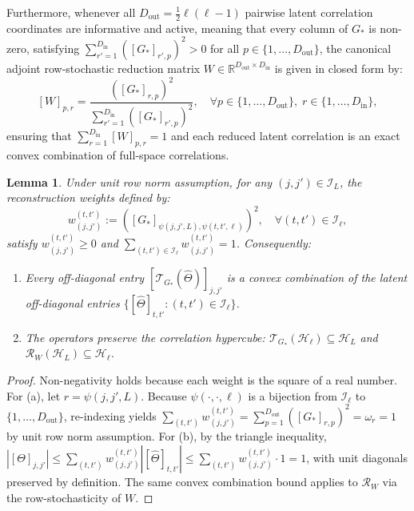 \documentclass[default,sn-mathphys,Numbered]{sn-jnl}
\theoremstyle{thmstyleone}
\newtheorem{lemma}[theorem]{Lemma}
\theoremstyle{thmstylethree}
\theoremstyle{thmstyletwo}
\newcommand{\inp}{\text{in}}
\newcommand{\outp}{\text{out}}
\begin{document}
Furthermore, whenever all $D_{\outp} = \frac{1}{2}\ell(\ell-1)$ pairwise latent correlation coordinates are informative and active, meaning that every column of $G_*$ is non-zero, satisfying $\sum_{r'=1}^{D_{\inp}} ([G_*]_{r', p})^2 > 0$ for all $p \in \{1, \ldots, D_{\outp}\}$, the canonical adjoint row-stochastic reduction matrix $W \in \mathbb{R}^{D_{\outp} \times D_{\inp}}$ is given in closed form by:
\begin{equation}
\label{eq:W_definition}
[W]_{p, r} = \frac{\left([G_*]_{r, p}\right)^2}{\sum_{r'=1}^{D_{\inp}} \left([G_*]_{r', p}\right)^2}, \quad \forall p \in \{1, \ldots, D_{\outp}\}, \; r \in \{1, \ldots, D_{\inp}\},
\end{equation}
ensuring that $\sum_{r=1}^{D_{\inp}} [W]_{p, r} = 1$ and each reduced latent correlation is an exact convex combination of full-space correlations.
    
\begin{lemma}
\label{lem:convex}\label{lem:entry_bound}\label{th:entry_bound}\label{lem:convex_bound}
Under unit row norm assumption, for any $(j, j') \in \mathcal{I}_L$, the reconstruction weights defined by:
\begin{equation}
\label{eq:weights}
w_{(j,j')}^{(t,t')} := \left( [G_*]_{\psi(j,j',L), \psi(t,t',\ell)} \right)^2, \quad \forall (t, t') \in \mathcal{I}_\ell,
\end{equation}
satisfy $w_{(j,j')}^{(t,t')} \ge 0$ and $\sum_{(t,t') \in \mathcal{I}_\ell} w_{(j,j')}^{(t,t')} = 1$. Consequently:
\begin{enumerate}
    \item[(a)] Every off-diagonal entry $[\mathcal{T}_{G_*}(\hat{\Theta})]_{j, j'}$ is a convex combination of the latent off-diagonal entries $\{ [\hat{\Theta}]_{t, t'} : (t, t') \in \mathcal{I}_\ell \}$.
    \item[(b)] The operators preserve the correlation hypercube: $\mathcal{T}_{G_*}(\mathcal{H}_\ell) \subseteq \mathcal{H}_L$ and $\mathcal{R}_W(\mathcal{H}_L) \subseteq \mathcal{H}_\ell$.
\end{enumerate}
\end{lemma}

\begin{proof}
Non-negativity holds because each weight is the square of a real number. For (a), let $r = \psi(j, j', L)$. Because $\psi(\cdot, \cdot, \ell)$ is a bijection from $\mathcal{I}_\ell$ to $\{1, \ldots, D_{\outp}\}$, re-indexing yields $\sum_{(t,t')} w_{(j,j')}^{(t,t')} = \sum_{p=1}^{D_{\outp}} ([G_*]_{r, p})^2 = \omega_r = 1$ by unit row norm assumption. For (b), by the triangle inequality, $|[\Theta]_{j, j'}| \le \sum_{(t,t')} w_{(j,j')}^{(t,t')} |[\hat{\Theta}]_{t, t'}| \le \sum_{(t,t')} w_{(j,j')}^{(t,t')} \cdot 1 = 1$, with unit diagonals preserved by definition. The same convex combination bound applies to $\mathcal{R}_W$ via the row-stochasticity of $W$.
\end{proof}
\end{document}
